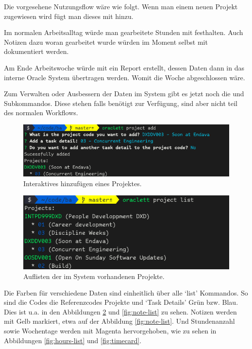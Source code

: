 \documentclass[oneside,bibliography=totocnumbered,BCOR=5mm]{scrbook}
\begin{document}
Die vorgesehene Nutzungsflow wäre wie folgt. Wenn man einem neuen Projekt
zugewiesen wird fügt man dieses  mit  hinzu.

Im normalen Arbeitsalltag würde man gearbeitete Stunden mit  festhalten. Auch Notizen dazu woran gearbeitet wurde würden im Moment
selbst mit  dokumentiert werden.

Am Ende Arbeitswoche würde mit  ein Report erstellt, dessen
Daten dann in das interne Oracle System übertragen werden. Womit die Woche
abgeschlossen wäre.

Zum Verwalten oder Ausbessern der Daten im System gibt es jetzt noch die
 und  Subkommandos. Diese stehen falls
benötigt zur Verfügung, sind aber nicht teil des normalen Workflows.

\begin{figure}[H]
  \centering
  \includegraphics[scale=0.5]{project-add.png}
  \caption{Interaktives hinzufügen eines Projektes.}
  \label{fig:project-add}
\end{figure}

\begin{figure}[H]
  \centering
  \includegraphics[scale=0.5]{project-list.png}
  \caption{Auflisten der im System vorhandenen Projekte.}
  \label{fig:project-list}
\end{figure}

Die Farben für verschiedene Daten sind einheitlich über alle `list' Kommandos.
So sind die Codes die Referenzcodes Projekte und `Task Details' Grün
bzw. Blau. Dies ist u.a. in den Abbildungen \ref{fig:project-list} und
\ref{fig:note-list} zu sehen. Notizen werden mit Gelb markiert, etwa auf der
Abbildung \ref{fig:note-list}. Und Stundenanzahl sowie Wochentage werden mit
Magenta hervorgehoben, wie zu sehen in Abbildungen \ref{fig:hours-list} und
\ref{fig:timecard}.
\end{document}
